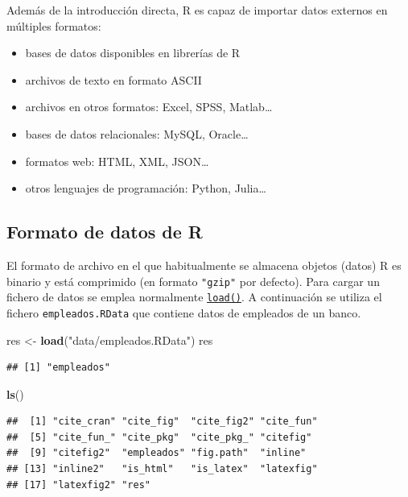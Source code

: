 \documentclass[
]{book}
\newenvironment{Shaded}{\begin{snugshade}}{\end{snugshade}}
\newcommand{\FunctionTok}[1]{\textcolor[rgb]{0.13,0.29,0.53}{\textbf{#1}}}
\newcommand{\NormalTok}[1]{#1}
\newcommand{\OtherTok}[1]{\textcolor[rgb]{0.56,0.35,0.01}{#1}}
\newcommand{\StringTok}[1]{\textcolor[rgb]{0.31,0.60,0.02}{#1}}
\begin{document}
Además de la introducción directa, R es capaz de
importar datos externos en múltiples formatos:

\begin{itemize}
\item
  bases de datos disponibles en librerías de R
\item
  archivos de texto en formato ASCII
\item
  archivos en otros formatos: Excel, SPSS, Matlab\ldots{}
\item
  bases de datos relacionales: MySQL, Oracle\ldots{}
\item
  formatos web: HTML, XML, JSON\ldots{}
\item
  otros lenguajes de programación: Python, Julia\ldots{}
\end{itemize}

\hypertarget{formato-de-datos-de-r}{%
\subsection{Formato de datos de R}\label{formato-de-datos-de-r}}

El formato de archivo en el que habitualmente se almacena objetos (datos)
R es binario y está comprimido (en formato \texttt{"gzip"} por defecto).
Para cargar un fichero de datos se emplea normalmente \href{https://www.rdocumentation.org/packages/base/versions/3.6.1/topics/load}{\texttt{load()}}.
A continuación se utiliza el fichero \texttt{empleados.RData} que contiene datos de empleados de un banco.

\begin{Shaded}
\begin{Highlighting}[]
\NormalTok{res }\OtherTok{\textless{}{-}} \FunctionTok{load}\NormalTok{(}\StringTok{"data/empleados.RData"}\NormalTok{)}
\NormalTok{res}
\end{Highlighting}
\end{Shaded}

\begin{verbatim}
## [1] "empleados"
\end{verbatim}

\begin{Shaded}
\begin{Highlighting}[]
\FunctionTok{ls}\NormalTok{()}
\end{Highlighting}
\end{Shaded}

\begin{verbatim}
##  [1] "cite_cran" "cite_fig"  "cite_fig2" "cite_fun" 
##  [5] "cite_fun_" "cite_pkg"  "cite_pkg_" "citefig"  
##  [9] "citefig2"  "empleados" "fig.path"  "inline"   
## [13] "inline2"   "is_html"   "is_latex"  "latexfig" 
## [17] "latexfig2" "res"
\end{verbatim}
\end{document}

